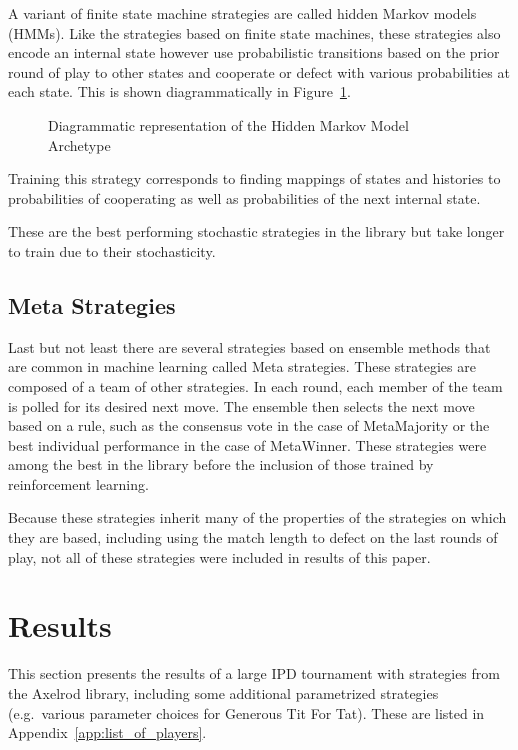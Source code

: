 \documentclass{article}
\begin{document}
A variant of finite state machine strategies are called hidden Markov models
(HMMs). Like the strategies based on finite state machines, these strategies
also encode an internal state however use probabilistic transitions based on the
prior round of play to other states and cooperate or defect with various
probabilities at each state. This is
shown diagrammatically in Figure~\ref{fig:hmm}.

\begin{figure}[!hbtp]
    \centering
    
    \caption{Diagrammatic representation of the Hidden Markov Model Archetype}
    \label{fig:hmm}
\end{figure}

Training this strategy corresponds to finding mappings of states and histories
to probabilities of cooperating as well as probabilities of the next internal
state.

These are the best performing stochastic strategies
in the library but take longer to train due to their stochasticity.

\subsection{Meta Strategies}

Last but not least there are several strategies based on ensemble methods that
are common in machine learning called Meta strategies. These strategies are
composed of a team of other strategies. In each round, each member of the team
is polled for its desired next
move. The ensemble then selects the next move based on a rule, such as the
consensus vote in the case of MetaMajority or the best individual performance
in the case of MetaWinner. These strategies were among the best in the library
before the inclusion of those trained by reinforcement learning.

Because these strategies inherit many of the properties of the strategies
on which they are based, including using the match length to defect on the last
rounds of play, not all of these strategies were included in results of this
paper.

\section{Results}\label{sec:results}

This section presents the results of a large IPD tournament with
strategies from the Axelrod library, including some additional parametrized
strategies (e.g.\ various parameter choices for Generous Tit For Tat). These are
listed in Appendix~\ref{app:list_of_players}.
\end{document}
